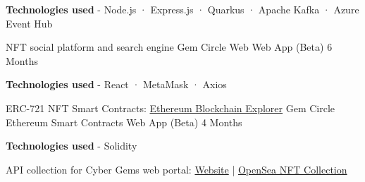 \begin{cventries}
{\begin{cvitems}
        \item {\textbf{Technologies used} \hspace{0.03cm} - \hspace{0.03cm} Node.js \hspace{0.03cm} · \hspace{0.03cm} Express.js \hspace{0.03cm} · \hspace{0.03cm} Quarkus \hspace{0.03cm} · \hspace{0.03cm} Apache Kafka \hspace{0.03cm} · \hspace{0.03cm} Azure Event Hub \\}
      \end{cvitems}
    }
  \cventry
    {NFT social platform and search engine} %
    {Gem Circle Web} %
    {Web App (Beta)} %
    {6 Months} %
    {
      \begin{cvitems} %
        \item {\textbf{Technologies used} \hspace{0.03cm} - \hspace{0.03cm} React \hspace{0.03cm} · \hspace{0.03cm} MetaMask \hspace{0.03cm} · \hspace{0.03cm} Axios \\}
      \end{cvitems}
    }
  \cventry
    {ERC-721 NFT Smart Contracts: \hyperlink{https://ropsten.etherscan.io/address/0x0EEFa3F75083b7a580CEb885Ec090443293daA8B}{Ethereum Blockchain Explorer}} %
    {Gem Circle Ethereum Smart Contracts} %
    {Web App (Beta)} %
    {4 Months} %
    {
      \begin{cvitems} %
        \item {\textbf{Technologies used} \hspace{0.03cm} - \hspace{0.03cm} Solidity \\}
      \end{cvitems}
    }
  \cventry
    {API collection for Cyber Gems web portal: \hyperlink{https://cybergems.com/}{Website} | \hyperlink{https://opensea.io/collection/cybergems-io}{OpenSea NFT Collection}} %

\end{cventries}
